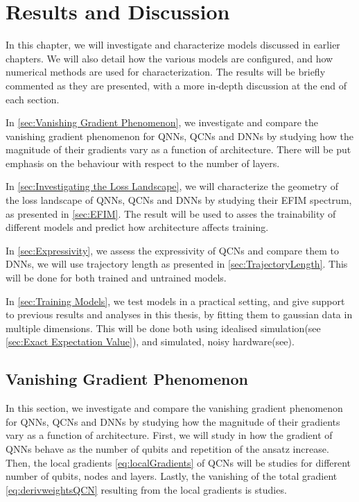 \chapter{Results and Discussion}\label{chap:results_discussion}
In this chapter, we will investigate and characterize models discussed in earlier chapters. We will also detail how the various models are configured, and how numerical methods are used for characterization. The results will be briefly commented as they are presented, with a more in-depth discussion at the end of each section.

In \autoref{sec:Vanishing Gradient Phenomenon}, we investigate and compare the vanishing gradient phenomenon for QNNs, QCNs and DNNs by studying how the magnitude of their gradients vary as a function of architecture. There will be put emphasis on the behaviour with respect to the number of layers.

In \autoref{sec:Investigating the Loss Landscape}, we will characterize the geometry of the loss landscape of QNNs, QCNs and DNNs by studying their EFIM spectrum, as presented in \autoref{sec:EFIM}. The result will be used to asses the trainability of different models and predict how architecture affects training.

In \autoref{sec:Expressivity}, we assess the expressivity of QCNs and compare them to DNNs, we will use trajectory length as presented in \autoref{sec:TrajectoryLength}. This will be done for both trained and untrained models.

In \autoref{sec:Training Models}, we test models in a practical setting, and give support to previous results and analyses in this thesis, by fitting them to gaussian data in multiple dimensions. This will be done both using idealised simulation(see \autoref{sec:Exact Expectation Value}), and simulated, noisy hardware(see).


\section{Vanishing Gradient Phenomenon}\label{sec:Vanishing Gradient Phenomenon}
In this section, we investigate and compare the vanishing gradient phenomenon for QNNs, QCNs and DNNs by studying how the magnitude of their gradients vary as a function of architecture. First, we will study in how the gradient of QNNs behave as the number of qubits and repetition of the ansatz increase. Then, the local gradients \autoref{eq:localGradients} of QCNs will be studies for different number of qubits, nodes and layers. Lastly, the vanishing of the total gradient \autoref{eq:derivweightsQCN} resulting from the local gradients is studies.  


